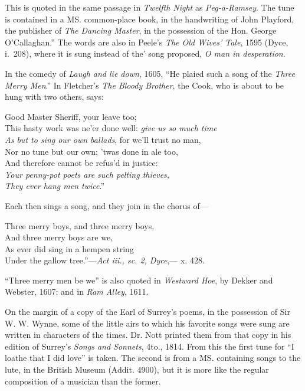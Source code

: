 This is quoted in the same passage in\textit{ Twelfth Night} as \textit{Peg-a-Ramsey}. The tune
is contained in a MS. common-place book, in the handwriting of John Playford,
the publisher of \textit{The Dancing Master}, in the possession of the Hon. George
O’Callaghan.” The words are also in Peele’s \textit{The Old Wives’ Tale}, 1595 (Dyce,
i.~208), where it is sung instead of the' song proposed, \textit{O man in desperation}.

In the comedy of \textit{Laugh and lie down}, 1605, “He plaied such a song of the
\textit{Three Merry Men}.” In Fletcher’s \textit{The Bloody Brother}, the Cook, who is about to
be hung with two others, says:
\settowidth{\versewidth}{This hasty work was ne’er done well: give us so much time}
\begin{scverse}
Good Master Sheriff, your leave too;\\
This hasty work was ne’er done well: \textit{give us so much time}\\
\textit{As but to sing our own ballads}, for we’ll trust no man,\\
Nor no tune but our own; ’twas done in ale too,\\
And therefore cannot be refus’d in justice:\\
\textit{Your penny-pot poets are such pelting thieves,\\
They ever hang men twice}.”
\end{scverse}
Each then sings a song, and they join in the chorus of—
\settowidth{\versewidth}{Three merry boys, and three merry boys,}
\begin{scverse}
Three merry boys, and three merry boys,\\
And three merry boys are we,\\
As ever did sing in a hempen string\\
Under the gallow tree.”—\textit{Act iii., sc. 2, Dyce},--- x. 428.
\end{scverse}
“Three merry men be we” is also quoted in \textit{Westward Hoe}, by Dekker and
Webster, 1607; and in \textit{Ram Alley}, 1611.


\smallskip



On the margin of a copy of the Earl of Surrey’s poems, in the possession of
Sir W. W. Wynne, some of the little airs to which his favorite songs were sung
are written in characters of the times. Dr. Nott printed them from that copy in
his edition of Surrey’s \textit{Songs and Sonnets},
 4to., 1814. From this the first tune
for “I loathe that I did love” is taken. The second is from a MS. containing
songs to the lute, in the British Museum (Addit. 4900), but it is more like the
regular composition of a musician than the former.
\pagebreak



